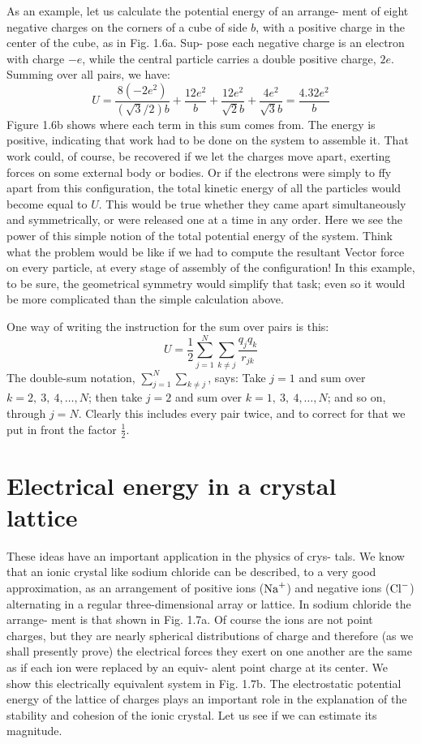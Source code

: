 As an example, let us calculate the potential energy of an arrange-
ment of eight negative charges on the corners of a cube of side $b$,
with a positive charge in the center of the cube, as in Fig. 1.6a. Sup-
pose each negative charge is an electron with charge $-e$, while the
central particle carries a double positive charge, $2e$. Summing over
all pairs, we have:
\begin{equation}
  U = \frac{8(-2e^2)}{(\sqrt{3}/2)b}+\frac{12e^2}{b}+\frac{12e^2}{\sqrt{2}b}
    +\frac{4e^2}{\sqrt{3}b}
    = \frac{4.32e^2}{b}
\end{equation}
Figure 1.6b shows where each term in this sum comes from. The
energy is positive, indicating that work had to be done on the system
to assemble it. That work could, of course, be recovered if we let the
charges move apart, exerting forces on some external body or bodies.
Or if the electrons were simply to ffy apart from this configuration,
the total kinetic energy of all the particles would become equal to $U$.
This would be true whether they came apart simultaneously and
symmetrically, or were released one at a time in any order. Here
we see the power of this simple notion of the total potential energy
of the system. Think what the problem would be like if we had to
compute the resultant Vector force on every particle, at every stage
of assembly of the configuration! In this example, to be sure, the
geometrical symmetry would simplify that task; even so it would be
more complicated than the simple calculation above.

One way of writing the instruction for the sum over pairs is this:
\begin{equation}
  U = \frac{1}{2} \sum_{j=1}^N \sum_{k\ne j} \frac{q_jq_k}{r_{jk}}
\end{equation}
The double-sum notation, $\sum_{j=1}^N \sum_{k\ne j}$, says: Take $j=1$ and sum over
$k = 2,\ 3,\ 4,\ldots,N$; then take $j=2$ and sum over
$k = 1,\ 3,\ 4,\ldots,N$;
and so on, through $j = N$. Clearly this includes every pair twice, and
to correct for that we put in front the factor $\frac{1}{2}$.

\section{Electrical energy in a crystal lattice}

These ideas have an important application in the physics of crys-
tals. We know that an ionic crystal like sodium chloride can be
described, to a very good approximation, as an arrangement of
positive ions ($\textup{Na}^+$) and negative ions ($\textup{Cl}^-$) alternating in a regular
three-dimensional array or lattice. In sodium chloride the arrange-
ment is that shown in Fig. 1.7a. Of course the ions are not point
charges, but they are nearly spherical distributions of charge and
therefore (as we shall presently prove) the electrical forces they exert
on one another are the same as if each ion were replaced by an equiv-
alent point charge at its center. We show this electrically equivalent
system in Fig. 1.7b. The electrostatic potential energy of the lattice
of charges plays an important role in the explanation of the stability
and cohesion of the ionic crystal. Let us see if we can estimate its
magnitude.

